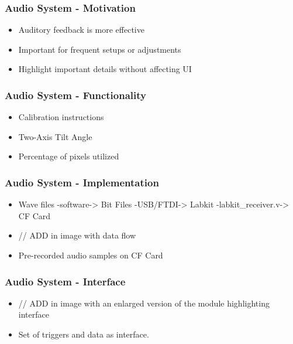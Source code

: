 \documentclass{beamer}
\begin{document}
\begin{frame}
\frametitle{Audio System - Motivation}
\begin{itemize}
	\item Auditory feedback is more effective
	\item Important for frequent setups or adjustments
	\item Highlight important details without affecting UI
\end{itemize}
\end{frame}

\begin{frame}
\frametitle{Audio System - Functionality}
\begin{itemize}
	\item Calibration instructions
	\item Two-Axis Tilt Angle
	\item Percentage of pixels utilized
\end{itemize}
\end{frame}

\begin{frame}
\frametitle{Audio System - Implementation}
\begin{itemize}
	\item Wave files -{software}-> Bit Files -{USB/FTDI}-> Labkit -{labkit_receiver.v}-> CF Card
	\item // ADD in image with data flow
	\item Pre-recorded audio samples on CF Card
\end{itemize}
\end{frame}

\begin{frame}
\frametitle{Audio System - Interface}
\begin{itemize}
	\item // ADD in image with an enlarged version of the module highlighting interface
	\item Set of triggers and data as interface.
\end{itemize}
\end{frame}
\end{document}
